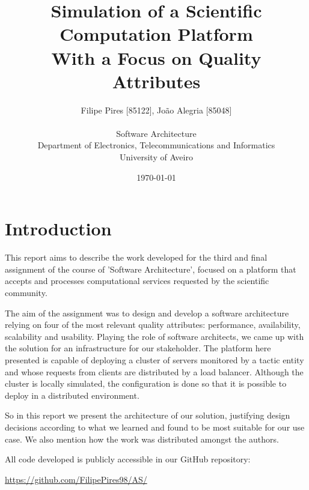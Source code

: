 \documentclass[12pt]{article}
\title{Simulation of a Scientific Computation Platform\\With a Focus on Quality Attributes}
\author
{Filipe Pires [85122], João Alegria [85048]\\
  \\
  Software Architecture\\
  \normalsize{Department of Electronics, Telecommunications and Informatics}\\
  \normalsize{University of Aveiro}\\
}
\date{\today{}}
\begin{document}
\baselineskip18pt

\maketitle

\section*{Introduction} %

This report aims to describe the work developed for the third and final assignment of the course of 'Software Architecture', focused on a platform that accepts
and processes computational services requested by the scientific community.

The aim of the assignment was to design and develop a software architecture relying on four of the most relevant quality attributes:
performance, availability, scalability and usability.
Playing the role of software architects, we came up with the solution for an infrastructure for our stakeholder.
The platform here presented is capable of deploying a cluster of servers monitored by a tactic entity and whose requests from clients are distributed by a load balancer.
Although the cluster is locally simulated, the configuration is done so that it is possible to deploy in a distributed environment.

So in this report we present the architecture of our solution, justifying design decisions according to what we learned and found to be most suitable for our use case.
We also mention how the work was distributed amongst the authors.

All code developed is publicly accessible in our GitHub repository:

\url{https://github.com/FilipePires98/AS/}

\end{document}
